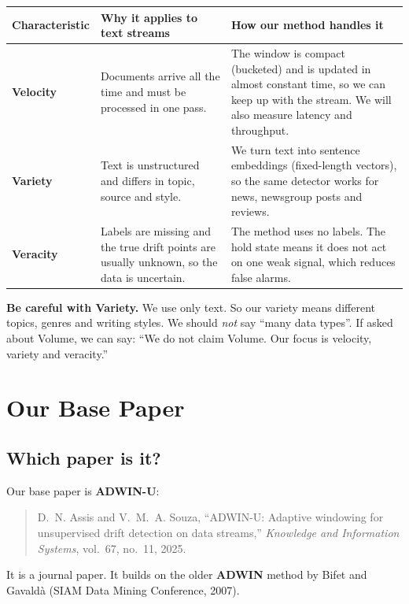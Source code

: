 \documentclass[11pt,a4paper]{article}
\begin{document}
\begin{center}
\begin{tabular}{@{}>{\bfseries}p{2.9cm}p{5cm}p{6cm}@{}}
\toprule
Characteristic & Why it applies to text streams & How our method handles it \\
\midrule
Velocity & Documents arrive all the time and must be processed in one pass. & The window is compact (bucketed) and is updated in almost constant time, so we can keep up with the stream. We will also measure latency and throughput. \\
Variety & Text is unstructured and differs in topic, source and style. & We turn text into sentence embeddings (fixed-length vectors), so the same detector works for news, newsgroup posts and reviews. \\
Veracity & Labels are missing and the true drift points are usually unknown, so the data is uncertain. & The method uses no labels. The hold state means it does not act on one weak signal, which reduces false alarms. \\
\bottomrule
\end{tabular}
\end{center}

\begin{keybox}
\textbf{Be careful with Variety.} We use only text. So our variety means different topics, genres and writing styles. We should \emph{not} say ``many data types''. If asked about Volume, we can say: ``We do not claim Volume. Our focus is velocity, variety and veracity.''
\end{keybox}

\section{Our Base Paper}

\subsection{Which paper is it?}
Our base paper is \textbf{ADWIN-U}:

\begin{quote}
D.~N. Assis and V.~M.~A. Souza, ``ADWIN-U: Adaptive windowing for unsupervised drift detection on data streams,'' \emph{Knowledge and Information Systems}, vol.~67, no.~11, 2025.
\end{quote}

It is a journal paper. It builds on the older \textbf{ADWIN} method by Bifet and Gavald\`a (SIAM Data Mining Conference, 2007).
\end{document}
